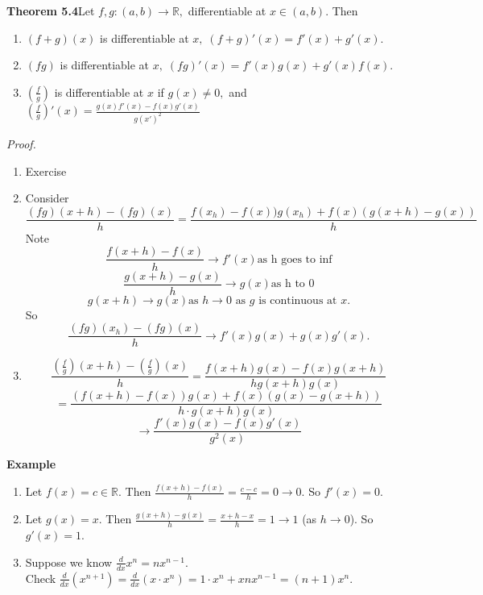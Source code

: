 \documentclass[12pt]{article}
\begin{document}
\vspace{1\baselineskip}
\begin{block}{\bf Theorem 5.4}Let $f,g\colon (a,b)\rightarrow\mathbb{R},$ differentiable at $x\in(a,b).$ Then
\begin{enumerate}[label=(\roman*)]
    \item $(f+g)(x)$ is differentiable at $x,\; (f+g)'(x)=f'(x)+g'(x).$
    \item $(fg)$ is differentiable at $x,\; (fg)'(x)=f'(x)g(x)+g'(x)f(x).$
    \item $\left(\frac{f}{g}\right)$ is differentiable at $x$ if $g(x)\neq 0,$ and $\left(\frac{f}{g}\right)'(x)=\frac{g(x)f'(x)-f(x)g'(x)}{g(x')^2}$
\end{enumerate}
\end{block}

\vspace{1\baselineskip}
\begin{block}{\sl Proof.}
\begin{enumerate}[label=(\roman*)]
    \item Exercise
    \item Consider $$\frac{(fg)(x+h)-(fg)(x)}{h} = \frac{f(x_h)-f(x))g(x_h)+f(x)(g(x+h)-g(x))}{h}$$
    Note $$\frac{f(x+h)-f(x)}{h}\rightarrow f'(x)\text{as h goes to inf}$$
    $$\frac{g(x+h)-g(x)}{h}\to g(x)\text{as h to 0}$$
    $$g(x+h) \to g(x)\text{as $h\to 0$ as $g$ is continuous at $x$.}$$
    So $$\frac{(fg)(x_h)-(fg)(x)}{h}\to f'(x)g(x)+g(x)g'(x).$$
    
    \item $$\frac{\left(\frac{f}{g}\right)(x+h)-\left(\frac{f}{g}\right)(x)}{h} = \frac{f(x+h)g(x)-f(x)g(x+h)}{hg(x+h)g(x)}$$
    $$=\frac{(f(x+h)-f(x))g(x)+f(x)(g(x)-g(x+h))}{h\cdot g(x+h)g(x)}$$
    $$\longrightarrow \frac{f'(x)g(x)-f(x)g'(x)}{g^2(x)}$$
\end{enumerate}
\end{block}

\vspace{1\baselineskip}
\begin{block}{\bf Example}
\begin{enumerate}[label=(\roman*)]
    \item Let $f(x)=c\in \mathbb{R}.$ Then $\frac{f(x+h)-f(x)}{h} = \frac{c-c}{h}=0\rightarrow 0.$ So $f'(x)=0$.
    \item Let $g(x)=x.$ Then $\frac{g(x+h)-g(x)}{h} = \frac{x+h-x}{h} = 1 \rightarrow 1$ (as $h\to 0$). So $g'(x)=1$.
    \item Suppose we know $\frac{d}{dx} x^n = nx^{n-1}.$ 
    \\Check $\frac{d}{dx}(x^{n+1}) = \frac{d}{dx} (x\cdot x^n) = 1\cdot x^n+xnx^{n-1}=(n+1)x^n.$
\end{enumerate}
\end{block}
\end{document}
